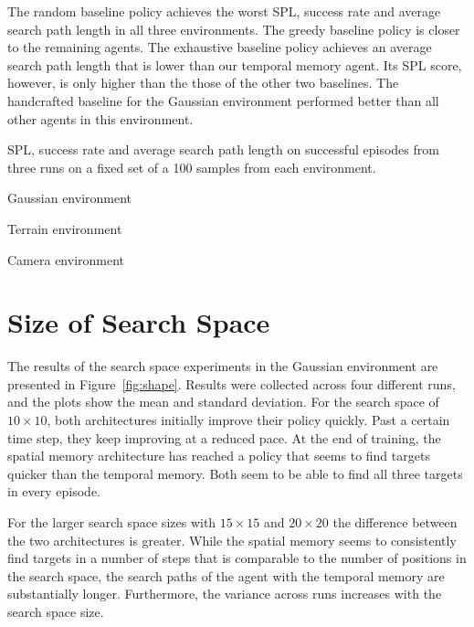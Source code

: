 The random baseline policy achieves the worst SPL, success rate and average search path length in all three environments.
The greedy baseline policy is closer to the remaining agents.
The exhaustive baseline policy achieves an average search path length that is lower than our temporal memory agent.
Its SPL score, however, is only higher than the those of the other two baselines.
The handcrafted baseline for the Gaussian environment performed better than all other agents in this environment. %

\begin{table}
    \centering
    \label{tab:metrics}
    \caption[Performance metrics for each environment.]{SPL, success rate and average search path length on successful episodes from three runs on a fixed set of a 100 samples from each environment.}
    Gaussian environment\par\vspace{0.5em}
    
    \par\vspace{1em}Terrain environment\par\vspace{0.5em}
    
    \par\vspace{1em}Camera environment\par\vspace{0.5em}
    
\end{table}

\section{Size of Search Space}
\label{sec:shape}

The results of the search space experiments in the Gaussian environment are presented in Figure~\ref{fig:shape}.
Results were collected across four different runs, and the plots show the mean and standard deviation.
For the search space of \(10 \times 10\), both architectures initially improve their policy quickly.
Past a certain time step, they keep improving at a reduced pace.
At the end of training, the spatial memory architecture has reached a policy that seems to find targets quicker than the temporal memory.
Both seem to be able to find all three targets in every episode.

For the larger search space sizes with \(15 \times 15\) and \(20 \times 20\) the difference between the two architectures is greater.
While the spatial memory seems to consistently find targets in a number of steps that is comparable to the number of positions in the search space,
the search paths of the agent with the temporal memory are substantially longer.
Furthermore, the variance across runs increases with the search space size.

